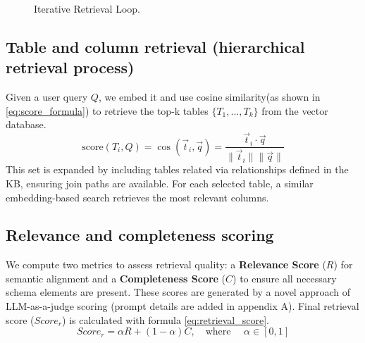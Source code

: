 \documentclass[runningheads]{llncs}
\begin{document}
\begin{figure}[ht]
{
}
\caption{Iterative Retrieval Loop.}
\label{fig:retrieval-loop-tikz}
\end{figure}
\subsection{Table and column retrieval (hierarchical retrieval process)}
Given a user query $Q$, we embed it and use cosine similarity(as shown in \ref{eq:score_formula}) to retrieve the top-k tables $\{T_1, \dots, T_k\}$ from the vector database.
\begin{equation} \label{eq:score_formula}
\text{score}(T_i, Q) = \cos(\vec{t}_i, \vec{q}) = \frac{\vec{t}_i \cdot \vec{q}}{\|\vec{t}_i\| \|\vec{q}\|}
\end{equation}
This set is expanded by including tables related via relationships defined in the KB, ensuring join paths are available. For each selected table, a similar embedding-based search retrieves the most relevant columns.

\subsection{Relevance and completeness scoring}
We compute two metrics to assess retrieval quality: a \textbf{Relevance Score} ($R$) for semantic alignment and a \textbf{Completeness Score} ($C$) to ensure all necessary schema elements are present. These scores are generated by a novel approach of LLM-as-a-judge scoring (prompt details are added in appendix A). Final retrieval score ($Score_r$) is calculated with formula \ref{eq:retrieval_score}.
\begin{equation} \label{eq:retrieval_score}
Score_r = \alpha R + (1-\alpha) C , \quad \text{where } \quad \alpha \in [0,1]
\end{equation}
\end{document}
